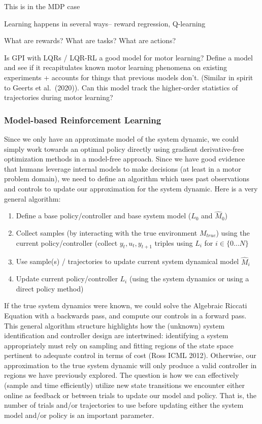 \documentclass[
  a4paper,
]{article}
\providecommand{\tightlist}{%
  \setlength{\itemsep}{0pt}\setlength{\parskip}{0pt}}
\begin{document}
This is in the MDP case

Learning happens in several ways-- reward regression, Q-learning

What are rewards? What are tasks? What are actions?

Is GPI with LQRs / LQR-RL a good model for motor learning? Define a
model and see if it recapitulates known motor learning phenomena on
existing experiments + accounts for things that previous models don't.
(Similar in spirit to Geerts et al.~(2020)). Can this model track the
higher-order statistics of trajectories during motor learning?

\hypertarget{model-based-reinforcement-learning}{%
\subsubsection{Model-based Reinforcement
Learning}\label{model-based-reinforcement-learning}}

Since we only have an approximate model of the system dynamic, we could
simply work towards an optimal policy directly using gradient
derivative-free optimization methods in a model-free approach. Since we
have good evidence that humans leverage internal models to make
decisions (at least in a motor problem domain), we need to define an
algorithm which uses past observations and controls to update our
approximation for the system dynamic. Here is a very general algorithm:

\begin{enumerate}
\def\labelenumi{\arabic{enumi}.}
\setcounter{enumi}{-1}
\tightlist
\item
  Define a base policy/controller and base system model (\(L_0\) and
  \(\hat{M}_0\))
\item
  Collect samples (by interacting with the true environment
  \(M_{true}\)) using the current policy/controller (collect
  \(y_t,u_t,y_{t+1}\) triples using \(L_i\) for \(i \in \{0\dots N\}\)
\item
  Use sample(s) / trajectories to update current system dynamical model
  \(\hat{M}_i\)
\item
  Update current policy/controller \(L_i\) (using the system dynamics or
  using a direct policy method)
\end{enumerate}

If the true system dynamics were known, we could solve the Algebraic
Riccati Equation with a backwards pass, and compute our controls in a
forward pass. This general algorithm structure highlights how the
(unknown) system identification and controller design are intertwined:
identifying a system appropriately must rely on sampling and fitting
regions of the state space pertinent to adequate control in terms of
cost (Ross ICML 2012). Otherwise, our approximation to the true system
dynamic will only produce a valid controller in regions we have
previously explored. The question is how we can effectively (sample and
time efficiently) utilize new state transitions we encounter either
online as feedback or between trials to update our model and policy.
That is, the number of trials and/or trajectories to use before updating
either the system model and/or policy is an important parameter.
\end{document}
